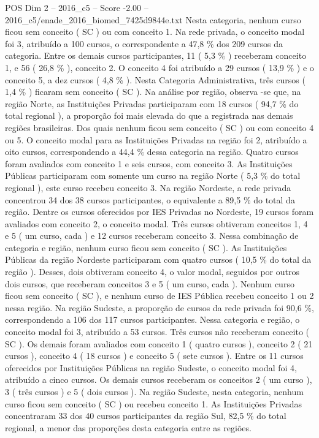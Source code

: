 \begin{textsample}{POS Dim 2 – 2016\_c5 – Score -2.00 – 2016\_c5/enade\_2016\_biomed\_7425d9844e.txt}
Nesta categoria, nenhum curso ficou sem conceito ( SC ) ou com conceito 1.
Na rede privada, o conceito modal foi 3, atribuído a 100 cursos, o correspondente a 47,8 \% dos 209 cursos da categoria.
Entre os demais cursos participantes, 11 ( 5,3 \% ) receberam conceito 1, e 56 ( 26,8 \% ), conceito 2.
O conceito 4 foi atribuído a 29 cursos ( 13,9 \% ) e o conceito 5, a dez cursos ( 4,8 \% ).
Nesta Categoria Administrativa, três cursos ( 1,4 \% ) ficaram sem conceito ( SC ).
Na análise por região, observa -se que, na região Norte, as Instituições Privadas participaram com 18 cursos ( 94,7 \% do total regional ), a proporção foi mais elevada do que a registrada nas demais regiões brasileiras.
Dos quais nenhum ficou sem conceito ( SC ) ou com conceito 4 ou 5.
O conceito modal para as Instituições Privadas na região foi 2, atribuído a oito cursos, correspondendo a 44,4 \% dessa categoria na região.
Quatro cursos foram avaliados com conceito 1 e seis cursos, com conceito 3.
As Instituições Públicas participaram com somente um curso na região Norte ( 5,3 \% do total regional ), este curso recebeu conceito 3.
Na região Nordeste, a rede privada concentrou 34 dos 38 cursos participantes, o equivalente a 89,5 \% do total da região.
Dentre os cursos oferecidos por IES Privadas no Nordeste, 19 cursos foram avaliados com conceito 2, o conceito modal.
Três cursos obtiveram conceitos 1, 4 e 5 ( um curso, cada ) e 12 cursos receberam conceito 3.
Nessa combinação de categoria e região, nenhum curso ficou sem conceito ( SC ).
As Instituições Públicas da região Nordeste participaram com quatro cursos ( 10,5 \% do total da região ).
Desses, dois obtiveram conceito 4, o valor modal, seguidos por outros dois cursos, que receberam conceitos 3 e 5 ( um curso, cada ).
Nenhum curso ficou sem conceito ( SC ), e nenhum curso de IES Pública recebeu conceito 1 ou 2 nessa região.
Na região Sudeste, a proporção de cursos da rede privada foi 90,6 \%, correspondendo a 106 dos 117 cursos participantes.
Nessa categoria e região, o conceito modal foi 3, atribuído a 53 cursos.
Três cursos não receberam conceito ( SC ).
Os demais foram avaliados com conceito 1 ( quatro cursos ), conceito 2 ( 21 cursos ), conceito 4 ( 18 cursos ) e conceito 5 ( sete cursos ).
Entre os 11 cursos oferecidos por Instituições Públicas na região Sudeste, o conceito modal foi 4, atribuído a cinco cursos.
Os demais cursos receberam os conceitos 2 ( um curso ), 3 ( três cursos ) e 5 ( dois cursos ).
Na região Sudeste, nesta categoria, nenhum curso ficou sem conceito ( SC ) ou recebeu conceito 1.
As Instituições Privadas concentraram 33 dos 40 cursos participantes da região Sul, 82,5 \% do total regional, a menor das proporções desta categoria entre as regiões.

\end{textsample}
